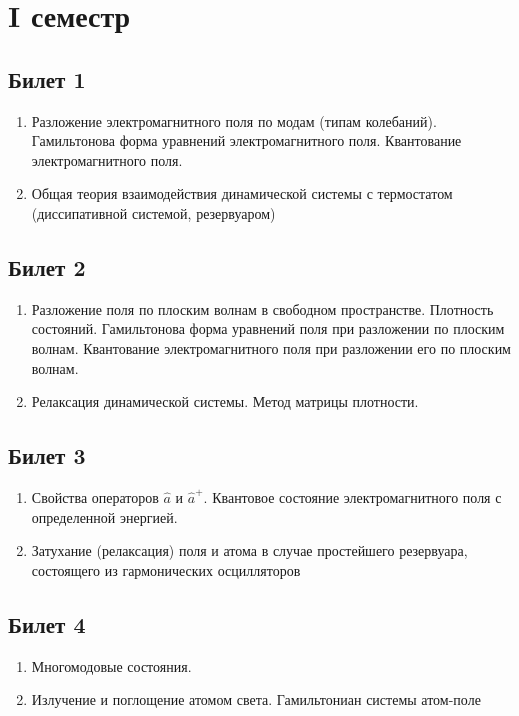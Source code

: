 


\Russian


\section*{I семестр}

\subsection*{Билет 1} 
\begin{enumerate}
\item Разложение электромагнитного поля по модам (типам колебаний).
Гамильтонова форма уравнений электромагнитного поля. Квантование
электромагнитного поля. 
\item Общая теория взаимодействия динамической системы с
  термостатом (диссипативной системой, резервуаром)
\end{enumerate}

\subsection*{Билет 2} 
\begin{enumerate}
\item Разложение поля по плоским волнам в свободном пространстве. 
Плотность состояний. Гамильтонова форма уравнений поля при разложении по плоским
волнам. Квантование электромагнитного поля при разложении его по
плоским волнам.
\item Релаксация динамической системы. Метод матрицы плотности. 
\end{enumerate}

\subsection*{Билет 3} 
\begin{enumerate}
\item Свойства операторов $ \hat a $ и $ \hat a ^+ $. Квантовое
состояние электромагнитного поля  с определенной энергией. 
\item Затухание
(релаксация) поля и атома в случае простейшего резервуара, состоящего из гармонических осцилляторов
\end{enumerate}

\subsection*{Билет 4} 
\begin{enumerate}
\item Многомодовые состояния. 
\item Излучение и поглощение атомом света. 
Гамильтониан системы атом-поле
\end{enumerate}

